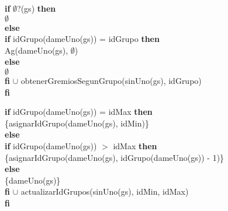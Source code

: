 \begin{tad}{}
\vspace{3 mm}


\vspace{3 mm}

{
	\textbf{if} $\emptyset$?(gs) \textbf{then} \\
		\hspace*{20pt}$\emptyset$	\\
	\textbf{else} \\
		\hspace*{20pt}\textbf{if} idGrupo(dameUno(gs)) = idGrupo \textbf{then} \\
			\hspace*{40pt}Ag(dameUno(gs), $\emptyset$) \\
		\hspace*{20pt}\textbf{else} \\
			\hspace*{40pt}$\emptyset$\\
		\hspace*{20pt}\textbf{fi} $\cup$ obtenerGremiosSegunGrupo(sinUno(gs), idGrupo)\\
	\textbf{fi} \\
}

\vspace{3 mm}

{
	\textbf{if} idGrupo(dameUno(gs)) = idMax \textbf{then} \\
		\hspace*{20pt}\{asignarIdGrupo(dameUno(gs), idMin)\}	\\
	\textbf{else} \\
		\hspace*{20pt}\textbf{if} idGrupo(dameUno(gs)) $>$ idMax \textbf{then} \\
			\hspace*{40pt} \{asignarIdGrupo(dameUno(gs), idGrupo(dameUno(gs)) - 1)\}	\\
		\hspace*{20pt}\textbf{else} \\
			\hspace*{40pt} \{dameUno(gs)\} \\
		\hspace*{20pt}\textbf{fi} $\cup$ actualizarIdGrupos(sinUno(gs), idMin, idMax)\\
	\textbf{fi} \\
}

\end{tad}

\newpage